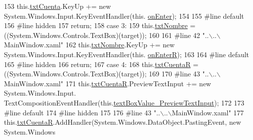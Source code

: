 \begin{DoxyCode}
153 \textcolor{preprocessor}{}            this.\hyperlink{class_asistencias__wpf_1_1_main_window_a52e76fc15be974c00138b13ab7e19b44}{txtCuenta}.KeyUp += \textcolor{keyword}{new} System.Windows.Input.KeyEventHandler(this.
      \hyperlink{class_asistencias__wpf_1_1_main_window_af5e3f09d78ecb240a880e737454e1246}{onEnter});
154             
155 \textcolor{preprocessor}{            #line default}
156 \textcolor{preprocessor}{}\textcolor{preprocessor}{            #line hidden}
157 \textcolor{preprocessor}{}            \textcolor{keywordflow}{return};
158             \textcolor{keywordflow}{case} 3:
159             this.\hyperlink{class_asistencias__wpf_1_1_main_window_acd918b065d257146f683ff317be832a6}{txtNombre} = ((System.Windows.Controls.TextBox)(target));
160             
161 \textcolor{preprocessor}{            #line 42 "..\(\backslash\)..\(\backslash\)MainWindow.xaml"}
162 \textcolor{preprocessor}{}            this.\hyperlink{class_asistencias__wpf_1_1_main_window_acd918b065d257146f683ff317be832a6}{txtNombre}.KeyUp += \textcolor{keyword}{new} System.Windows.Input.KeyEventHandler(this.
      \hyperlink{class_asistencias__wpf_1_1_main_window_a021f286d29f89afb7e646c8a02fdcb4b}{onEnterR});
163             
164 \textcolor{preprocessor}{            #line default}
165 \textcolor{preprocessor}{}\textcolor{preprocessor}{            #line hidden}
166 \textcolor{preprocessor}{}            \textcolor{keywordflow}{return};
167             \textcolor{keywordflow}{case} 4:
168             this.\hyperlink{class_asistencias__wpf_1_1_main_window_a4ce5343faaf6dc02bc33f5da846cd4db}{txtCuentaR} = ((System.Windows.Controls.TextBox)(target));
169             
170 \textcolor{preprocessor}{            #line 43 "..\(\backslash\)..\(\backslash\)MainWindow.xaml"}
171 \textcolor{preprocessor}{}            this.\hyperlink{class_asistencias__wpf_1_1_main_window_a4ce5343faaf6dc02bc33f5da846cd4db}{txtCuentaR}.PreviewTextInput += \textcolor{keyword}{new} System.Windows.Input.
      TextCompositionEventHandler(this.\hyperlink{class_asistencias__wpf_1_1_main_window_a952d704cbea0440a9215abf74fe0ab17}{textBoxValue\_PreviewTextInput});
172             
173 \textcolor{preprocessor}{            #line default}
174 \textcolor{preprocessor}{}\textcolor{preprocessor}{            #line hidden}
175 \textcolor{preprocessor}{}            
176 \textcolor{preprocessor}{            #line 43 "..\(\backslash\)..\(\backslash\)MainWindow.xaml"}
177 \textcolor{preprocessor}{}            this.\hyperlink{class_asistencias__wpf_1_1_main_window_a4ce5343faaf6dc02bc33f5da846cd4db}{txtCuentaR}.AddHandler(System.Windows.DataObject.PastingEvent, \textcolor{keyword}{new} System.Windows

\end{DoxyCode}
